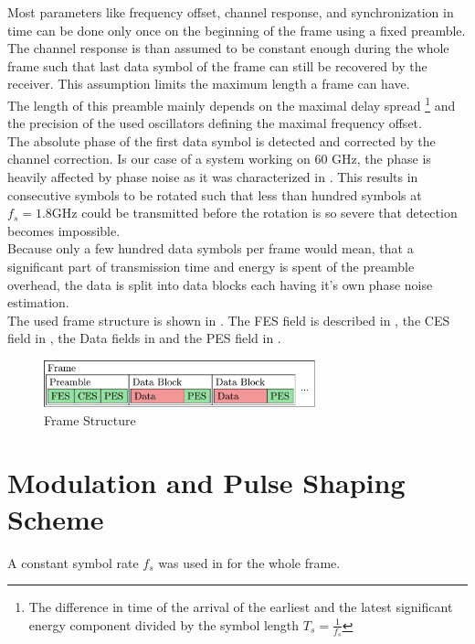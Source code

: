 Most parameters like frequency offset, channel response, and
synchronization in time can be done only once on the beginning of the
frame using a fixed preamble.
The channel response is than assumed to be constant enough during
the whole frame such that last data symbol of the frame can still be
recovered by the receiver. This assumption limits the maximum length a frame
can have. \\

The length of this preamble mainly depends on the maximal delay spread
\footnote{The difference in time of the arrival of the earliest and the
  latest significant energy component divided by the symbol length
  $T_s = \frac{1}{f_s}$} and the precision of the used oscillators defining
the maximal frequency offset. \\

The absolute phase of the first data symbol is detected and corrected by the
channel correction. Is our case of a system working on 60 GHz, the
phase is heavily affected by phase noise as it was characterized in
. This results in consecutive symbols to be
rotated such that less than hundred symbols at $f_s = 1.8 \text{GHz}$
could be transmitted before the rotation is so severe that detection
becomes impossible. \\

Because only a few hundred data symbols per frame would mean,
that a significant part of transmission time and energy is spent
of the preamble overhead, the data is split into data blocks each having
it's own phase noise estimation. \\

The used frame structure is shown in .
The \gls{FES} field is described in ,
the \gls{CES} field in ,
the Data fields in  and the
\gls{PES} field in .

\begin{figure}[ht]
  \centering
  \includegraphics[width=0.7\textwidth]{figures/frame_struct}
  \caption{Frame Structure}
  \label{fig:sys_frame_struct}
\end{figure}

\section{Modulation and Pulse Shaping Scheme}
A constant symbol rate $f_s$ was used in for the whole frame. \\


